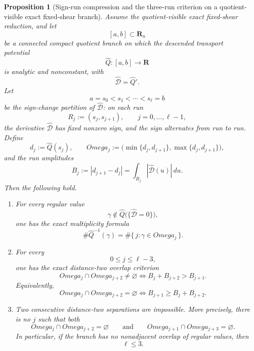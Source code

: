 \documentclass[11pt,a4paper]{amsart}
\def\Omega{Omega}%
\theoremstyle{plain}
\newtheorem{proposition}[theorem]{Proposition}
\theoremstyle{definition}
\begin{document}
\begin{proposition}[Sign-run compression and the three-run criterion on a quotient-visible exact fixed-shear branch]
\label{prop:sign-run-compression-three-lobe-criterion-fixed-shear-quotient-branch}
Assume the quotient-visible exact fixed-shear reduction, and let
\[
[a,b]\subset \mathbf R_u
\]
be a connected compact quotient branch on which the descended transport
potential
\[
\widehat Q:[a,b]\to\mathbf R
\]
is analytic and nonconstant, with
\[
\widehat{\mathcal D}=\widehat Q'.
\]
Let
\[
a=s_0<s_1<\cdots<s_\ell=b
\]
be the sign-change partition of $\widehat{\mathcal D}$: on each run
\[
R_j:=(s_j,s_{j+1}),
\qquad
j=0,\dots,\ell-1,
\]
the derivative $\widehat{\mathcal D}$ has fixed nonzero sign, and the sign
alternates from run to run. Define
\[
d_j:=\widehat Q(s_j),
\qquad
\Omega_j:=\bigl(\min\{d_j,d_{j+1}\},\max\{d_j,d_{j+1}\}\bigr),
\]
and the run amplitudes
\[
B_j:=|d_{j+1}-d_j|
=
\int_{R_j}|\widehat{\mathcal D}(u)|\,du.
\]
Then the following hold.

\begin{enumerate}
\item For every regular value
\[
\gamma\notin \widehat Q\bigl(\{\widehat{\mathcal D}=0\}\bigr),
\]
one has the exact multiplicity formula
\[
\#\widehat Q^{-1}(\gamma)=\#\{\,j:\gamma\in\Omega_j\,\}.
\]

\item For every
\[
0\le j\le \ell-3,
\]
one has the exact distance-two overlap criterion
\[
\Omega_j\cap\Omega_{j+2}\neq\varnothing
\iff
B_j+B_{j+2}>B_{j+1}.
\]
Equivalently,
\[
\Omega_j\cap\Omega_{j+2}=\varnothing
\iff
B_{j+1}\ge B_j+B_{j+2}.
\]

\item Two consecutive distance-two separations are impossible. More precisely,
there is no $j$ such that both
\[
\Omega_j\cap\Omega_{j+2}=\varnothing
\qquad\text{and}\qquad
\Omega_{j+1}\cap\Omega_{j+3}=\varnothing.
\]
In particular, if the branch has no nonadjacent overlap of regular values, then
\[
\ell\le 3.
\]
\end{enumerate}
\end{proposition}
\end{document}
